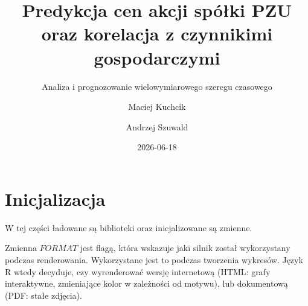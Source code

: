 \documentclass[
  polish,
  letterpaper,
  DIV=11,
  numbers=noendperiod]{scrartcl}
\title{Predykcja cen akcji spółki PZU oraz korelacja z czynnikimi
gospodarczymi}
\subtitle{Analiza i prognozowanie wielowymiarowego szeregu czasowego}
\author{Maciej Kuchcik \and Andrzej Szuwald}
\date{2026-06-18}
\renewcommand*\contentsname{Spis treści}
\newcommand\contentsname{Spis treści}
\begin{document}
\maketitle

\renewcommand*\contentsname{Spis treści}
{
\setcounter{tocdepth}{3}
\tableofcontents
}

\section*{Inicjalizacja}\label{inicjalizacja}

W tej części ładowane są biblioteki oraz inicjalizowane są zmienne.

Zmienna \(FORMAT\) jest flagą, która wskazuje jaki silnik został
wykorzystany podczas renderowania. Wykorzystane jest to podczas
tworzenia wykresów. Język R wtedy decyduje, czy wyrenderować wersję
internetową (HTML: grafy interaktywne, zmieniające kolor w zależności od
motywu), lub dokumentową (PDF: stałe zdjęcia).
\end{document}
